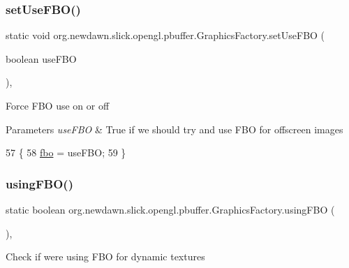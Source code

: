 \subsubsection{\texorpdfstring{set\+Use\+F\+B\+O()}{setUseFBO()}}
{\footnotesize\ttfamily static void org.\+newdawn.\+slick.\+opengl.\+pbuffer.\+Graphics\+Factory.\+set\+Use\+F\+BO (\begin{DoxyParamCaption}\item[{boolean}]{use\+F\+BO }\end{DoxyParamCaption})\hspace{0.3cm}{\ttfamily [inline]}, {\ttfamily [static]}}

Force F\+BO use on or off


\begin{DoxyParams}{Parameters}
{\em use\+F\+BO} & True if we should try and use F\+BO for offscreen images \\
\hline
\end{DoxyParams}

\begin{DoxyCode}
57                                                  \{
58         \mbox{\hyperlink{classorg_1_1newdawn_1_1slick_1_1opengl_1_1pbuffer_1_1_graphics_factory_a9ff71f4ef96ff435c621dcfb206b5bd7}{fbo}} = useFBO;
59     \}
\end{DoxyCode}
\mbox{\label{classorg_1_1newdawn_1_1slick_1_1opengl_1_1pbuffer_1_1_graphics_factory_a8f59891b057912c68edd1877fbc9b157}} 
\subsubsection{\texorpdfstring{using\+F\+B\+O()}{usingFBO()}}
{\footnotesize\ttfamily static boolean org.\+newdawn.\+slick.\+opengl.\+pbuffer.\+Graphics\+Factory.\+using\+F\+BO (\begin{DoxyParamCaption}{ }\end{DoxyParamCaption})\hspace{0.3cm}{\ttfamily [inline]}, {\ttfamily [static]}}

Check if we\textquotesingle{}re using F\+BO for dynamic textures

